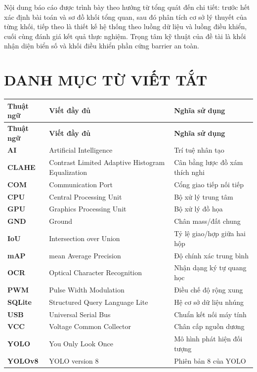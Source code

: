 \documentclass[a4paper,14pt]{extreport}
\begin{document}
Nội dung báo cáo được trình bày theo hướng từ tổng quát đến chi tiết: trước hết xác định bài toán và sơ đồ khối tổng quan, sau đó phân tích cơ sở lý thuyết của từng khối, tiếp theo là thiết kế hệ thống theo luồng dữ liệu và luồng điều khiển, cuối cùng đánh giá kết quả thực nghiệm. Trọng tâm kỹ thuật của đề tài là khối nhận diện biển số và khối điều khiển phần cứng barrier an toàn.


\chapter*{DANH MỤC TỪ VIẾT TẮT}

\begin{longtable}{>{\bfseries}l p{5cm} p{6cm}}
\toprule
\textbf{Thuật ngữ} & \textbf{Viết đầy đủ} & \textbf{Nghĩa sử dụng} \\
\midrule
\endfirsthead
\toprule
\textbf{Thuật ngữ} & \textbf{Viết đầy đủ} & \textbf{Nghĩa sử dụng} \\
\midrule
\endhead
AI & Artificial Intelligence & Trí tuệ nhân tạo \\
CLAHE & Contrast Limited Adaptive Histogram Equalization & Cân bằng lược đồ xám thích nghi \\
COM & Communication Port & Cổng giao tiếp nối tiếp \\
CPU & Central Processing Unit & Bộ xử lý trung tâm \\
GPU & Graphics Processing Unit & Bộ xử lý đồ họa \\
GND & Ground & Chân mass/đất chung \\
IoU & Intersection over Union & Tỷ lệ giao/hợp giữa hai hộp \\
mAP & mean Average Precision & Độ chính xác trung bình \\
OCR & Optical Character Recognition & Nhận dạng ký tự quang học \\
PWM & Pulse Width Modulation & Điều chế độ rộng xung \\
SQLite & Structured Query Language Lite & Hệ cơ sở dữ liệu nhúng \\
USB & Universal Serial Bus & Chuẩn kết nối máy tính \\
VCC & Voltage Common Collector & Chân cấp nguồn dương \\
YOLO & You Only Look Once & Mô hình phát hiện đối tượng \\
YOLOv8 & YOLO version 8 & Phiên bản 8 của YOLO \\
\bottomrule
\end{longtable}
\end{document}
